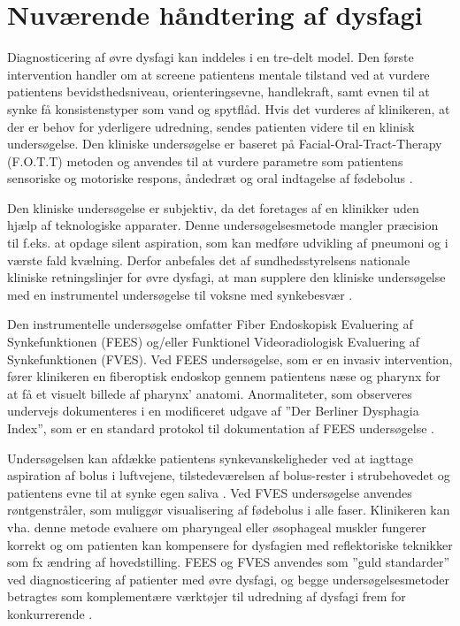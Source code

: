\documentclass[main.tex]{subfiles}
\begin{document}
\section{Nuværende håndtering af dysfagi}


Diagnosticering af øvre dysfagi kan inddeles i en tre-delt model. Den første intervention handler om at screene patientens mentale tilstand ved at vurdere patientens bevidsthedsniveau, orienteringsevne, handlekraft, samt evnen til at synke få konsistenstyper som vand og spytflåd. Hvis det vurderes af klinikeren, at der er behov for yderligere udredning, sendes patienten videre til en klinisk undersøgelse. Den kliniske undersøgelse er baseret på Facial-Oral-Tract-Therapy (F.O.T.T) metoden og anvendes til at vurdere parametre som patientens sensoriske og motoriske respons, åndedræt og oral indtagelse af fødebolus \cite[s. 23-25]{Kjaersgaard2013DifficultiesPerspective}. 

Den kliniske undersøgelse er subjektiv, da det foretages af en klinikker uden hjælp af teknologiske apparater. Denne undersøgelsesmetode mangler præcision til f.eks. at opdage silent aspiration, som kan medføre udvikling af pneumoni og i værste fald kvælning. Derfor anbefales det af sundhedsstyrelsens nationale kliniske retningslinjer for øvre dysfagi, at man supplere den kliniske undersøgelse med en instrumentel undersøgelse til voksne med synkebesvær \cite{Sundhedsstyrelsen2015NationalDysfagi}.

Den instrumentelle undersøgelse omfatter Fiber Endoskopisk Evaluering af Synkefunktionen (FEES) og/eller Funktionel Videoradiologisk Evaluering af Synkefunktionen (FVES).  Ved FEES undersøgelse, som er en invasiv intervention, fører klinikeren en fiberoptisk endoskop gennem patientens næse og pharynx for at få et visuelt billede af pharynx' anatomi. Anormaliteter, som observeres undervejs dokumenteres i en modificeret udgave af ”Der Berliner Dysphagia Index”, som er en standard protokol til dokumentation af FEES undersøgelse \cite{afLambertsenKMDKock-JensenCMDKjrsgaardAMScOTHansenTSMsci/MPHWestergaardLMD2007ModificeretIndex}. 

Undersøgelsen kan afdække patientens synkevanskeligheder ved at iagttage aspiration af bolus i luftvejene, tilstedeværelsen af bolus-rester i strubehovedet og patientens evne til at synke egen saliva \cite[s. 27-28]{Kjaersgaard2013DifficultiesPerspective}. 
Ved FVES undersøgelse anvendes røntgenstråler, som muliggør visualisering af fødebolus i alle faser. Klinikeren kan vha. denne metode evaluere om pharyngeal eller øsophageal muskler fungerer korrekt og om patienten kan kompensere for dysfagien med reflektoriske teknikker som fx ændring af hovedstilling. FEES og FVES anvendes som ”guld standarder” ved diagnosticering af patienter med øvre dysfagi, og begge undersøgelsesmetoder betragtes som komplementære værktøjer til udredning af dysfagi frem for konkurrerende \cite[s. 50]{Kjaersgaard2013DifficultiesPerspective}.




\end{document}
